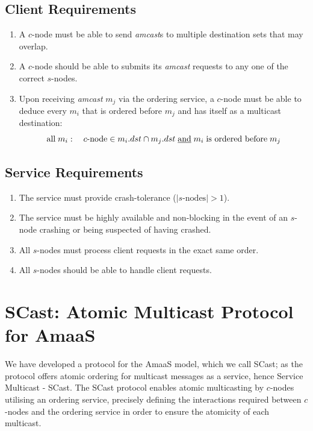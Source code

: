 	\subsection*{Client Requirements}
	\begin{enumerate}[label=\bfseries CR\arabic*]
		\item A $c$-node must be able to send \emph{amcast}s to multiple destination sets that may overlap.
		
		\item A $c$-node should be able to submits its \emph{amcast} requests to any one of the correct $s$-nodes.  
		
		\item Upon receiving \emph{amcast} $m_j$ via the ordering service, a $c$-node must be able to deduce every $m_i$ that is ordered before $m_j$ and has itself as a multicast destination:
		\begin{equation*}
		    \mbox{all}\; m_i : \quad c\mbox{-node} \in m_i.dst \cap m_j.dst \;\mbox{\underline{and}}\; m_i \;\mbox{is ordered before}\; m_j
		\end{equation*}
	\end{enumerate}
	
    \subsection*{Service Requirements}
	\begin{enumerate}[label=\bfseries SR\arabic*]
		\item The service must provide crash-tolerance ($|s\text{-nodes}| > 1$).
		
		\item The service must be highly available and non-blocking in the event of an $s$-node crashing or being suspected of having crashed.  
				
		\item All $s$-nodes must process client requests in the exact same order.
		
		\item All $s$-nodes should be able to handle client requests.  %
	\end{enumerate}

\section{SCast: Atomic Multicast Protocol for AmaaS}\label{sec:scast_protocol}
We have developed a protocol for the \textsf{AmaaS} model, which we call \textsf{SCast}; as the protocol offers atomic ordering for multicast messages as a service, hence Service Multicast - \textsf{SCast}.  The \textsf{SCast} protocol enables atomic multicasting by $c$-nodes utilising an ordering service, precisely defining the interactions required between $c$-nodes and the ordering service in order to ensure the atomicity of each multicast.  

